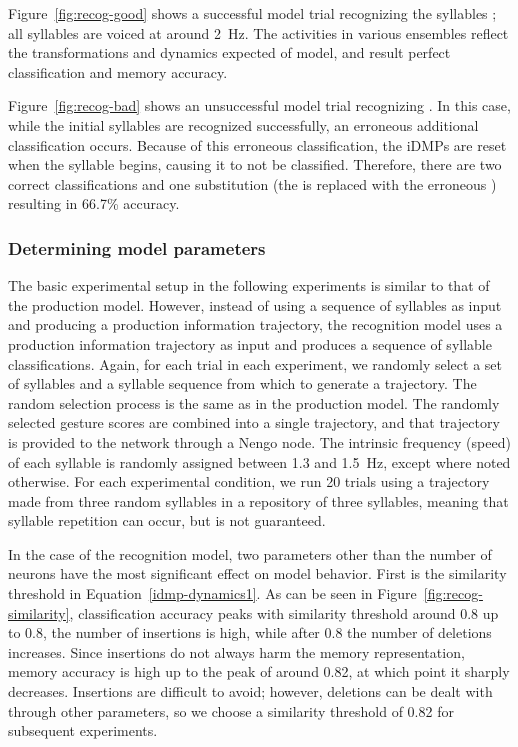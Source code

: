 Figure~\ref{fig:recog-good} shows
a successful model trial
recognizing the syllables
;
all syllables are voiced
at around 2~Hz.
The activities in various ensembles
reflect the transformations
and dynamics expected of model,
and result
perfect classification and memory accuracy.



Figure~\ref{fig:recog-bad}
shows an unsuccessful model trial
recognizing .
In this case, while the initial
\ipa{[blA ti]} syllables
are recognized successfully,
an erroneous additional
\ipa{[ti]} classification occurs.
Because of this erroneous classification,
the iDMPs are reset when
the \ipa{[dAs]} syllable begins,
causing it to not be classified.
Therefore, there are two correct
classifications and one substitution
(the \ipa{[dAs]} is replaced with the
erroneous \ipa{[ti]})
resulting in 66.7\% accuracy.

\subsubsection{Determining model parameters}

The basic experimental setup
in the following experiments
is similar to that of the production model.
However, instead of using
a sequence of syllables
as input and producing
a production information trajectory,
the recognition model
uses a production information trajectory
as input and produces
a sequence of syllable classifications.
Again, for each trial in each experiment,
we randomly select a set of syllables
and a syllable sequence
from which to generate a trajectory.
The random selection process
is the same as in the production model.
The randomly selected
gesture scores are combined
into a single trajectory,
and that trajectory
is provided to the network
through a Nengo node.
The intrinsic frequency (speed)
of each syllable is randomly assigned
between 1.3 and 1.5~Hz,
except where noted otherwise.
For each experimental condition,
we run 20 trials using
a trajectory made from
three random syllables
in a repository of three syllables,
meaning that syllable repetition can occur,
but is not guaranteed.


In the case of the recognition model,
two parameters other than the number of neurons
have the most significant effect on model behavior.
First is the similarity threshold
in Equation~\eqref{idmp-dynamics1}.
As can be seen in Figure~\ref{fig:recog-similarity},
classification accuracy peaks with
similarity threshold around 0.8
up to 0.8, the number of insertions
is high, while after 0.8
the number of deletions increases.
Since insertions do not always harm
the memory representation,
memory accuracy is high
up to the peak of around 0.82,
at which point it sharply decreases.
Insertions are difficult to avoid;
however, deletions can be dealt
with through other parameters,
so we choose a similarity threshold of
0.82 for subsequent experiments.

